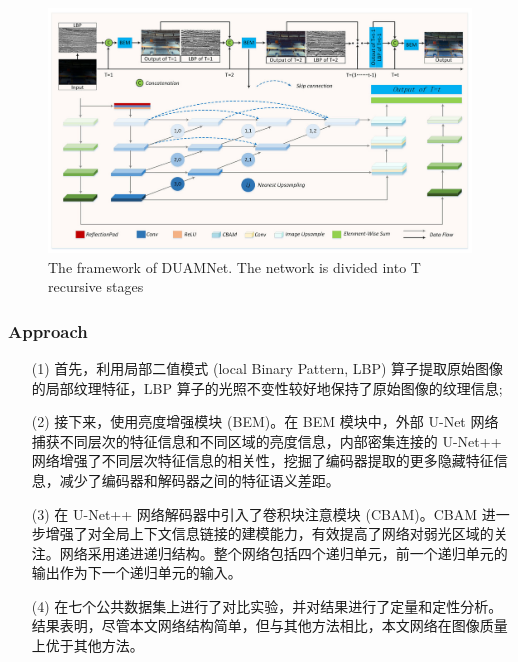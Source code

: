 \documentclass[a4paper, 10pt]{article}
\begin{document}
			\begin{figure}[htbp]
				\centering 
				\includegraphics[width=\columnwidth]{picture/LLIE/Dual UNet/DUAMNet framework}
				\caption{
					\label{fig: DUAMNet framework} 
					The framework of DUAMNet. The network is divided into T recursive stages
				}
			\end{figure}
			
			\subsubsection{Approach}
	
			\begin{itemize}
				\item[(1)] 
				首先，利用局部二值模式 (local Binary Pattern, LBP) 算子提取原始图像的局部纹理特征，LBP 算子的光照不变性较好地保持了原始图像的纹理信息;
				
				\item[(2)]
				接下来，使用亮度增强模块 (BEM)。在 BEM 模块中，外部 U-Net 网络捕获不同层次的特征信息和不同区域的亮度信息，内部密集连接的 U-Net++ 网络增强了不同层次特征信息的相关性，挖掘了编码器提取的更多隐藏特征信息，减少了编码器和解码器之间的特征语义差距。
				
				\item[(3)]
				在 U-Net++ 网络解码器中引入了卷积块注意模块 (CBAM)。CBAM 进一步增强了对全局上下文信息链接的建模能力，有效提高了网络对弱光区域的关注。网络采用递进递归结构。整个网络包括四个递归单元，前一个递归单元的输出作为下一个递归单元的输入。
				
				\item[(4)]
				在七个公共数据集上进行了对比实验，并对结果进行了定量和定性分析。结果表明，尽管本文网络结构简单，但与其他方法相比，本文网络在图像质量上优于其他方法。
				
			\end{itemize}	
		
\end{document}
